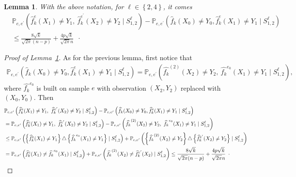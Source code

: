 \documentclass[twoside,11pt]{article}
\numberwithin{equation}{section}
\newtheorem{lem}{Lemma}[section]
\newcommand{\f}[1]{ \widehat{f}_k( #1 ) }
\newcommand{\fe}[1]{ \widehat{f}_k^e(#1 ) }
\newcommand{\fep}[1]{ \widehat{f}_k^{e^\prime}(#1 ) }
\newcommand{\1}{\mathds{1}}%
\newcommand{\paren}[1]{\left( #1 \right)}
\newcommand{\acc}[1]{\left\{ #1 \right\}}
\renewcommand{\P}{\mathbb{P}}
\numberwithin{equation}{section}
\theoremstyle{plain}
\begin{document}
\begin{lem}\label{lem.2.in.e}
With the above notation, for $\ell \in \acc{2,4}$, it comes
\begin{align*}
& \P_{e,e^\prime} \paren{\fe{X_1}\neq Y_1,\ \fep{X_2}\neq Y_2 \mid S^{\ell}_{1,2}} - \P_{e,e^\prime} \paren{\f{X_0}\neq Y_0,\fe{X_{1}}\neq Y_{1} \mid S^{\ell}_{1,2}} \\
& \leq \frac{8\sqrt{k}}{\sqrt{2\pi} (n-p)} + \frac{4p\sqrt{k}}{\sqrt{2\pi} n} \enspace\cdot
\end{align*}

\end{lem}

\begin{proof}[Proof of Lemma~\ref{lem.2.in.e}]
As for the previous lemma, first notice that
\begin{eqnarray*}
\P_{e,e^\prime} \paren{\f{X_0}\neq Y_0,\fe{X_{1}}\neq Y_{1} \mid S^{\ell}_{1,2}} =\P_{e,e^\prime} \paren{\widehat{f_k}^{(2)}(X_2)\neq Y_2,\ \widehat{f_k}^{e_0}(X_1)\neq Y_1 \mid S^{\ell}_{1,2}} ,
\end{eqnarray*}
where $\widehat{f_k}^{e_0}$ is built on sample $e$ with observation $(X_2,Y_2)$ replaced with $(X_0,Y_0)$. Then
{\small
\begin{align*}
&\P_{e,e^\prime} \paren{\fe{X_1}\neq Y_1,\ \fep{X_2}\neq Y_2 \mid S^{\ell}_{1,2}}- \P_{e,e^\prime} \paren{\f{X_0}\neq Y_0,\fe{X_{1}}\neq Y_{1} \mid S^{\ell}_{1,2}} \\
%
&=\small \P_{e,e^\prime} \paren{\fe{X_1}\neq Y_1,\ \fep{X_2}\neq Y_2 \mid S^{\ell}_{1,2}}-\P_{e,e^\prime} \paren{\widehat{f_k}^{(2)}(X_2)\neq Y_2,\ \widehat{f_k}^{e_0}(X_1)\neq Y_1 \mid S^{\ell}_{1,2}}  \\
%
&\leq \P_{e,e^\prime} \paren{\left\{\fe{X_1}\neq Y_1\right\}\triangle \left\{\widehat{f_k}^{e_0}(X_1)\neq Y_1\right\} \mid S^{\ell}_{1,2}} +\P_{e,e^\prime} \paren{\left\{\widehat{f_k}^{(2)}(X_2)\neq Y_2\right\} \triangle\left\{ \fep{X_2}\neq Y_2\right\} \mid S^{\ell}_{1,2}}\\
%
&= \P_{e,e^\prime} \paren{\fe{X_1}\neq \widehat{f_k}^{e_0}(X_1)\mid S^{\ell}_{1,2}} + \P_{e,e^\prime} \paren{\widehat{f_k}^{(2)}(X_2)\neq  \fep{X_2} \mid S^{\ell}_{1,2}} \leq \frac{8\sqrt{k}}{\sqrt{2\pi} (n-p)} + \frac{4p\sqrt{k}}{\sqrt{2\pi} n} \enspace\cdot
\end{align*}}

\end{proof}
\end{document}
